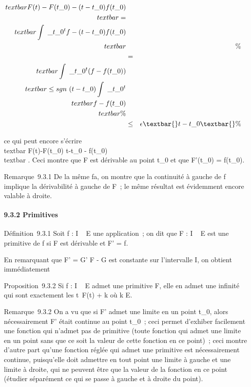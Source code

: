 \documentclass[]{article}
\begin{document}
\begin{align*} \\textbar{}F(t) -
F(t\_0) - (t -
t\_0)f(t\_0)\\textbar{}
=\\textbar{}\int ~
\_t\_0^tf - (t - t\_
0)f(t\_0)\\textbar{}&&\%&
\\ & =&
\\textbar{}\int ~
\_t\_0^t(f - f(t\_
0))\\textbar{} \leq sgn~(t -
t\_0)\int ~
\_t\_0^t\\textbar{}f - f(t\_
0)\\textbar{}\%& \\ &
\leq& \epsilon\textbar{}t - t\_0\textbar{} \%&
\\ \end{align*}

ce qui peut encore s'écrire \\textbar{}
F(t)-F(t\_0) \over t-t\_0 -
f(t\_0)\\textbar{} \leq \epsilon. Ceci montre que F est
dérivable au point t\_0 et que F'(t\_0) =
f(t\_0).

Remarque~9.3.1 De la même fa\ccon, on montre que la
continuité à gauche de f implique la dérivabilité à gauche de F~; le
même résultat est évidemment encore valable à droite.

\paragraph{9.3.2 Primitives}

Définition~9.3.1 Soit f : I \rightarrow~ E une application~; on dit que F : I \rightarrow~ E
est une primitive de f si F est dérivable et F' = f.

En remarquant que F' = G' \Leftrightarrow F - G est
constante sur l'intervalle I, on obtient immédiatement

Proposition~9.3.2 Si f : I \rightarrow~ E admet une primitive F, elle en admet une
infinité qui sont exactement les t\mapsto~F(t) + k
où k \in E.

Remarque~9.3.2 On a vu que si F' admet une limite en un point
t\_0, alors nécessairement F' était continue au point
t\_0~; ceci permet d'exhiber facilement une fonction qui n'admet
pas de primitive (toute fonction qui admet une limite en un point sans
que ce soit la valeur de cette fonction en ce point)~; ceci montre
d'autre part qu'une fonction réglée qui admet une primitive est
nécessairement continue, puisqu'elle doit admettre en tout point une
limite à gauche et une limite à droite, qui ne peuvent être que la
valeur de la fonction en ce point (étudier séparément ce qui se passe à
gauche et à droite du point).
\end{document}
